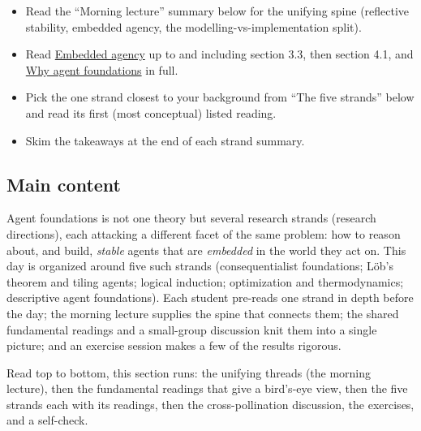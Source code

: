 \documentclass[11pt]{article}
\begin{document}
\begin{itemize}
\item
  Read the ``Morning lecture'' summary below for the unifying spine (reflective stability, embedded agency, the modelling-vs-implementation split).
\item
  Read \href{https://www.lesswrong.com/posts/i3BTagvt3HbPMx6PN/embedded-agency-full-text-version}{Embedded agency} up to and including section 3.3, then section 4.1, and \href{https://www.lesswrong.com/posts/FWvzwCDRgcjb9sigb/why-agent-foundations-an-overly-abstract-explanation}{Why agent foundations} in full.
\item
  Pick the one strand closest to your background from ``The five strands'' below and read its first (most conceptual) listed reading.
\item
  Skim the takeaways at the end of each strand summary.
\end{itemize}

\subsection{Main content}
Agent foundations is not one theory but several research strands (research directions), each attacking a different facet of the same problem: how to reason about, and build, \emph{stable} agents that are \emph{embedded} in the world they act on. This day is organized around five such strands (consequentialist foundations; Löb's theorem and tiling agents; logical induction; optimization and thermodynamics; descriptive agent foundations). Each student pre-reads one strand in depth before the day; the morning lecture supplies the spine that connects them; the shared fundamental readings and a small-group discussion knit them into a single picture; and an exercise session makes a few of the results rigorous.

Read top to bottom, this section runs: the unifying threads (the morning lecture), then the fundamental readings that give a bird's-eye view, then the five strands each with its readings, then the cross-pollination discussion, the exercises, and a self-check.
\end{document}
